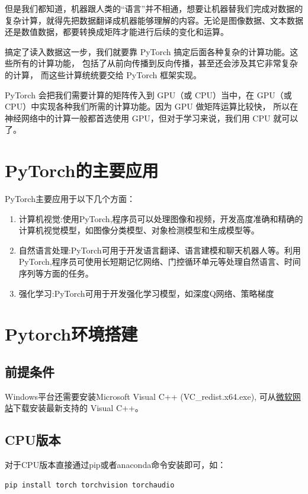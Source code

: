 但是我们都知道，机器跟人类的“语言”并不相通，想要让机器替我们完成对数据的复杂计算，就得先把数据翻译成机器能够理解的内容。无论是图像数据、文本数据还是数值数据，都要转换成矩阵才能进行后续的变化和运算。

搞定了读入数据这一步，我们就要靠 PyTorch 搞定后面各种复杂的计算功能。这些所有的计算功能，
包括了从前向传播到反向传播，甚至还会涉及其它非常复杂的计算，
而这些计算统统要交给 PyTorch 框架实现。

PyTorch 会把我们需要计算的矩阵传入到 GPU（或 CPU）当中，在 GPU（或 CPU）中实现各种我们所需的计算功能。因为 GPU 做矩阵运算比较快，
所以在神经网络中的计算一般都首选使用 GPU，但对于学习来说，我们用 CPU 就可以了。

\section{PyTorch的主要应用}
PyTorch主要应用于以下几个方面：
\begin{enumerate}[label=\arabic*)]
    \item 计算机视觉:使用PyTorch,程序员可以处理图像和视频，开发高度准确和精确的计算机视觉模型，如图像分类模型、对象检测模型和生成模型等。
    \item 自然语言处理:PyTorch可用于开发语言翻译、语言建模和聊天机器人等。利用PyTorch,程序员可使用长短期记忆网络、门控循环单元等处理自然语言、时间序列等方面的任务。
    \item 强化学习:PyTorch可用于开发强化学习模型，如深度Q网络、策略梯度
\end{enumerate}

\section{Pytorch环境搭建}
\subsection{前提条件}
Windows平台还需要安装Microsoft Visual C++ (VC\_redist.x64.exe),
可从\href{https://docs.microsoft.com/zh-CN/cpp/windows/latest-supported-vc-redist}{微软网站}下载安装最新支持的 Visual C++。

\subsection{CPU版本}
对于CPU版本直接通过pip或者anaconda命令安装即可，如：
\begin{lstlisting}[style=demostyle,numbers=none]
pip install torch torchvision torchaudio
\end{lstlisting}

